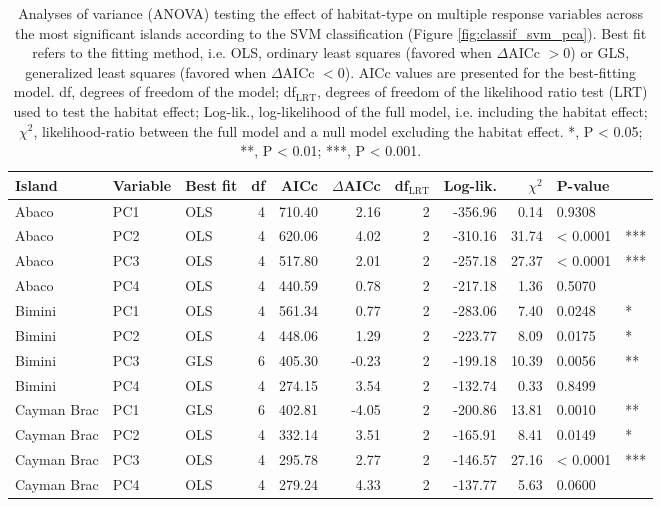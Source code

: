 \begin{table}[H]
    \centering
    \caption{Analyses of variance (ANOVA) testing the effect of habitat-type on multiple response variables across the most significant islands according to the SVM classification (Figure \ref{fig:classif_svm_pca}). Best fit refers to the fitting method, i.e. OLS, ordinary least squares (favored when $\Delta$AICc $> 0$) or GLS, generalized least squares (favored when $\Delta$AICc $< 0$). AICc values are presented for the best-fitting model. df, degrees of freedom of the model; df$_{\mbox{LRT}}$, degrees of freedom of the likelihood ratio test (LRT) used to test the habitat effect; Log-lik., log-likelihood of the full model, i.e. including the habitat effect; $\chi^2$, likelihood-ratio between the full model and a null model excluding the habitat effect. *, P < 0.05; **, P < 0.01; ***, P < 0.001.}
    \begin{tabular}{lllrrrrrrll}
        \hline
        Island & Variable & Best fit & df & AICc & $\Delta$AICc & df$_{\mbox{LRT}}$ & Log-lik. & $\chi^2$ & P-value & \\
        \hline
        Abaco & PC1 & OLS & 4 & 710.40 & 2.16 & 2 & -356.96 & 0.14 & 0.9308 & \\
        Abaco & PC2 & OLS & 4 & 620.06 & 4.02 & 2 & -310.16 & 31.74 & < 0.0001 &  ***\\
        Abaco & PC3 & OLS & 4 & 517.80 & 2.01 & 2 & -257.18 & 27.37 & < 0.0001 &  ***\\
        Abaco & PC4 & OLS & 4 & 440.59 & 0.78 & 2 & -217.18 & 1.36 & 0.5070 &  \\
        Bimini & PC1 & OLS & 4 & 561.34 & 0.77 & 2 & -283.06 & 7.40 & 0.0248 &  *\\
        Bimini & PC2 & OLS & 4 & 448.06 & 1.29 & 2 & -223.77 & 8.09 & 0.0175 &  *\\
        Bimini & PC3 & GLS & 6 & 405.30 & -0.23 & 2 & -199.18 & 10.39 & 0.0056 &  **\\
        Bimini & PC4 & OLS & 4 & 274.15 & 3.54 & 2 & -132.74 & 0.33 & 0.8499 &  \\
        Cayman Brac & PC1 & GLS & 6 & 402.81 & -4.05 & 2 & -200.86 & 13.81 & 0.0010 &  **\\
        Cayman Brac & PC2 & OLS & 4 & 332.14 & 3.51 & 2 & -165.91 & 8.41 & 0.0149 &  *\\
        Cayman Brac & PC3 & OLS & 4 & 295.78 & 2.77 & 2 & -146.57 & 27.16 & < 0.0001 &  ***\\
        Cayman Brac & PC4 & OLS & 4 & 279.24 & 4.33 & 2 & -137.77 & 5.63 & 0.0600 &  \\

\end{tabular}
\end{table}
